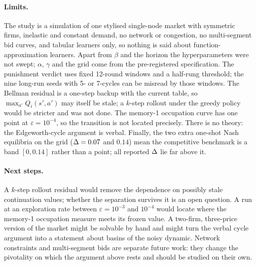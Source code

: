 \paragraph{Limits.}
The study is a simulation of one stylised single-node market with symmetric firms, inelastic and constant demand, no network or congestion, no multi-segment bid curves, and tabular learners only, so nothing is said about function-approximation learners. Apart from $\beta$ and the horizon the hyperparameters were not swept; $\alpha$, $\gamma$ and the grid come from the pre-registered specification. The punishment verdict uses fixed 12-round windows and a half-rung threshold; the nine long-run seeds with 5- or 7-cycles can be misread by those windows. The Bellman residual is a one-step backup with the current table, so $\max_{a'} Q_i(s', a')$ may itself be stale; a $k$-step rollout under the greedy policy would be stricter and was not done. The memory-1 occupation curve has one point at $\varepsilon = 10^{-4}$, so the transition is not located precisely. There is no theory: the Edgeworth-cycle argument is verbal. Finally, the two extra one-shot Nash equilibria on the grid ($\Delta = 0.07$ and $0.14$) mean the competitive benchmark is a band $[0, 0.14]$ rather than a point; all reported $\Delta$ lie far above it.

\paragraph{Next steps.}
A $k$-step rollout residual would remove the dependence on possibly stale continuation values; whether the separation survives it is an open question. A run at an exploration rate between $\varepsilon = 10^{-3}$ and $10^{-4}$ would locate where the memory-1 occupation measure meets its frozen value. A two-firm, three-price version of the market might be solvable by hand and might turn the verbal cycle argument into a statement about basins of the noisy dynamic. Network constraints and multi-segment bids are separate future work: they change the pivotality on which the argument above rests and should be studied on their own.
